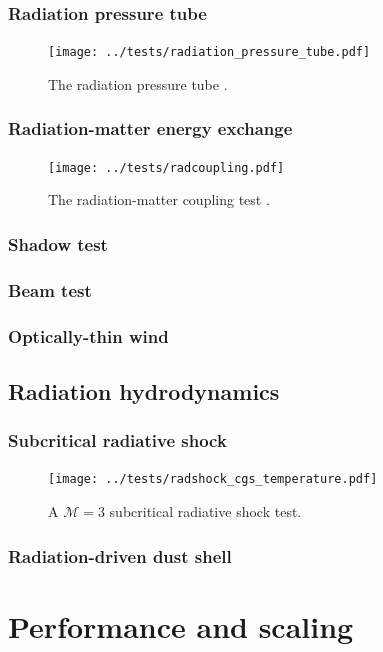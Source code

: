 \documentclass[fleqn,usenatbib]{mnras}
\begin{document}
\subsubsection{Radiation pressure tube}
\begin{figure}
    \texttt{[image: ../tests/radiation\_pressure\_tube.pdf]}
    \caption{The radiation pressure tube \citep{Krumholz_2007}.}
    \label{fig:radiation_pressure_tube}
\end{figure}
\subsubsection{Radiation-matter energy exchange}
\begin{figure}
    \texttt{[image: ../tests/radcoupling.pdf]}
    \caption{The radiation-matter coupling test \citep{Turner_2001}.}
    \label{fig:radcoupling}
\end{figure}
\subsubsection{Shadow test}
\subsubsection{Beam test}
\subsubsection{Optically-thin wind}

\subsection{Radiation hydrodynamics}
\subsubsection{Subcritical radiative shock}
\begin{figure}
    \texttt{[image: ../tests/radshock\_cgs\_temperature.pdf]}
    \caption{A $\mathcal{M} = 3$ subcritical radiative shock test.}
    \label{fig:radshock}
\end{figure}
\subsubsection{Radiation-driven dust shell}

\section{Performance and scaling}
\label{section:performance}
\end{document}
